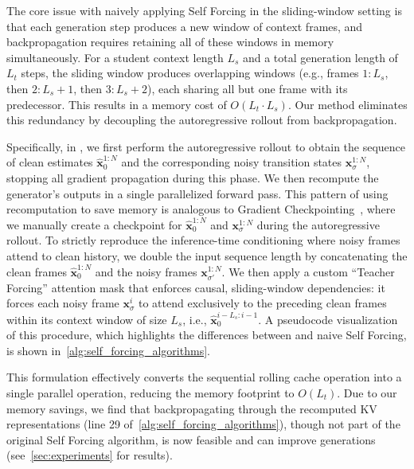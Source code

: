 The core issue with naively applying Self Forcing in the sliding-window setting is that each generation step produces a new window of context frames, and backpropagation requires retaining all of these windows in memory simultaneously. For a student context length $L_s$ and a total generation length of $L_t$ steps, the sliding window produces overlapping windows (e.g., frames $1{:}L_s$, then $2{:}L_s{+}1$, then $3{:}L_s{+}2$), each sharing all but one frame with its predecessor. This results in a memory cost of $O(L_t \cdot L_s)$. Our method eliminates this redundancy by decoupling the autoregressive rollout from backpropagation.

Specifically, in \oursf, we first perform the autoregressive rollout to obtain the sequence of clean estimates $\hat{\mathbf{x}}_0^{1:N}$ and the corresponding noisy transition states $\mathbf{x}_{\sigma}^{1:N}$, stopping all gradient propagation during this phase. We then recompute the generator's outputs in a single parallelized forward pass. This pattern of using recomputation to save memory is analogous to Gradient Checkpointing~\cite{chen2016trainingdeepnetssublinear,griewank2000revolve}, where we manually create a checkpoint for $\hat{\mathbf{x}}_0^{1:N}$ and $\mathbf{x}_{\sigma}^{1:N}$ during the autoregressive rollout. To strictly reproduce the inference-time conditioning where noisy frames attend to clean history, we double the input sequence length by concatenating the clean frames $\hat{\mathbf{x}}_0^{1:N}$ and the noisy frames $\mathbf{x}_{\sigma'}^{1:N}$. We then apply a custom ``Teacher Forcing'' attention mask that enforces causal, sliding-window dependencies: it forces each noisy frame $\mathbf{x}_{\sigma}^i$ to attend exclusively to the preceding clean frames within its context window of size $L_s$, i.e., $\hat{\mathbf{x}}_0^{i-L_s:i-1}$. A pseudocode visualization of this procedure, which highlights the differences between \oursf and naive Self Forcing, is shown in~\cref{alg:self_forcing_algorithms}.

This formulation effectively converts the sequential rolling cache operation into a single parallel operation, reducing the memory footprint to $O(L_t)$. Due to our memory savings, we find that backpropagating through the recomputed KV representations (line 29 of~\cref{alg:self_forcing_algorithms}), though not part of the original Self Forcing algorithm, is now feasible and can improve generations (see~\cref{sec:experiments} for results).











